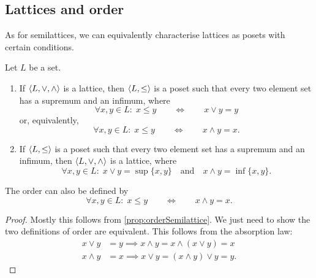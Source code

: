 \subsection{Lattices and order}
As for semilattices, we can equivalently characterise lattices as posets with certain conditions.
\begin{proposition}
Let $L$ be a set.
\begin{enumerate}
\item If $\langle L,\vee, \wedge \rangle$ is a lattice, then $\langle L,\leq \rangle$ is a poset such that every two element set has a supremum and an infimum, where
\[ \forall x,y\in L:\; x\leq y \qquad \iff \qquad x\vee y = y \]
or, equivalently,
\[ \forall x,y\in L:\; x\leq y \qquad \iff \qquad x\wedge y = x. \]
\item If $\langle L,\leq \rangle$ is a poset such that every two element set has a supremum and an infimum, then $\langle L,\vee, \wedge \rangle$ is a lattice, where
\[ \forall x,y\in L: \; x\vee y = \sup\{x,y\} \quad \text{and} \quad x\wedge y = \inf\{x,y\}. \]
\end{enumerate}
The order can also be defined by
\[ \forall x,y\in L:\; x\leq y \qquad \iff \qquad x\wedge y = x. \]
\end{proposition}
\begin{proof}
Mostly this follows from \ref{prop:orderSemilattice}. We just need to show the two definitions of order are equivalent. This follows from the absorption law:
\begin{align*}
x\vee y &= y \implies x\wedge y = x\wedge (x\vee y) = x \\
x\wedge y &= x \implies x\vee y = (x\wedge y) \vee y = y.
\end{align*}
\end{proof}

